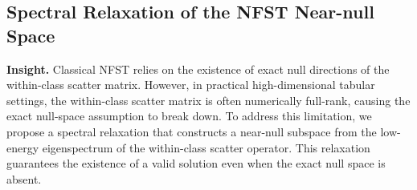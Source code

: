 \documentclass[final,twocolumn,10pt]{elsarticle}
\begin{document}











\subsection{Spectral Relaxation of the NFST Near-null Space}
\label{subsec:projection_XXX}


\noindent \textbf{Insight.}
Classical NFST relies on the existence of exact null directions of the within-class scatter matrix. However, in practical high-dimensional tabular settings, the within-class scatter matrix is often numerically full-rank, causing the exact null-space assumption to break down. To address this limitation, we propose a spectral relaxation that constructs a near-null subspace from the low-energy eigenspectrum of the within-class scatter operator. This relaxation guarantees the existence of a valid solution even when the exact null space is absent.
\end{document}
